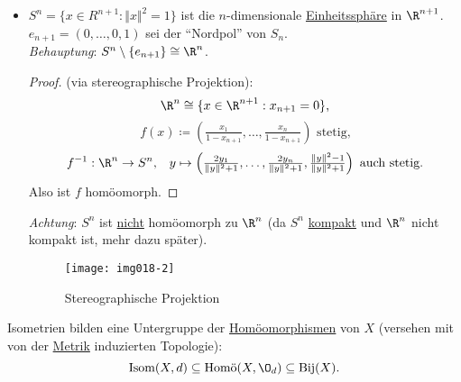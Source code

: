 \begin{example}
\begin{itemize}
\begin{proof}
        (über $ \epsilon $-$ \delta $-Definition): $ \delta \coloneqq \epsilon $. \\
        $ d_X(x, y) < \delta \Rightarrow d_Y(f(x), f(y)) = d_X(x,y) < \delta = \epsilon $, also ist $ f $ stetig. \\
        Analog für $ f^{-1} $.
      \end{proof}
    \item $ S^n = \{ x \in R^{n+1} : \Vert x \Vert^2 = 1 \} $ ist die $ n $-dimensionale \hyperref[bsp:einheitssphaere]{Einheitssphäre} in $ \R^{n+1} $. \\
      $ e_{n+1} = (0,\dots,0,1) $ sei der ``Nordpol'' von $ S_n $. \\
      \emph{Behauptung}: $ S^n\setminus\{ e_{n+1} \} \cong \R^n $.
      \begin{proof}
        (via stereographische Projektion):
        \begin{equation*}
          \R^n \cong \{ x \in \R^{n+1} : x_{n+1} = 0 \}\text{,}
        \end{equation*}
        \begin{equation*}
          f(x) \coloneqq (\tfrac{x_1}{1-x_{n+1}}, \dots, \tfrac{x_n}{1-x_{n+1}}) \text{ stetig,}
        \end{equation*}
        \begin{equation*}
          f^{-1}: \R^n \to S^n\text{,} \quad y \mapsto \left( \tfrac{2y_1}{\Vert y \Vert^2+1}, \dots, \tfrac{2y_n}{\Vert y \Vert^2+1}, \tfrac{\Vert y \Vert^2-1}{\Vert y \Vert^2+1} \right)\text{ auch stetig.}
        \end{equation*}
        Also ist $ f $ homöomorph.
      \end{proof}
      \emph{Achtung}: $ S^n $ ist \underline{nicht} homöomorph zu $ \R^n $ (da $ S^n $ \hyperref[def:kompakt]{kompakt} und $ \R^n $ nicht kompakt ist, mehr dazu später).
      \begin{figure}[H]
        \label{img018-2}
        \texttt{[image: img018-2]}
        \caption{Stereographische Projektion}
      \end{figure}
  \end{itemize}
\end{example}

\begin{remark}
  Isometrien bilden eine Untergruppe der \hyperref[def:homoeomorphismus]{Homöomorphismen} von $ X $ (versehen mit von der \hyperref[def:metrik]{Metrik} induzierten Topologie):
  \begin{equation*}
    \text{Isom}(X, d) \subseteq \text{Homö}(X, \O_d) \subseteq \text{Bij}(X)\text{.}
  \end{equation*}
\end{remark}

